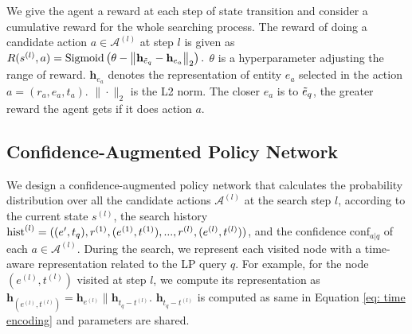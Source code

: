 \documentclass[runningheads]{llncs}
\begin{document}
We give the agent a reward at each step of state transition and consider a cumulative reward for the whole 
searching process. The reward of doing a candidate action $a \in \mathcal{A}^{(l)}$ at step $l$ is given as 
$R(s^{(l)}, a) = \text{Sigmoid}\left(\theta - \left\|\mathbf{h}_{\Tilde{e}_q} - \mathbf{h}_{e_{a}}\right\|_2\right).$
$\theta$ is a hyperparameter adjusting the range of reward. $\mathbf{h}_{e_{a}}$ denotes the representation of entity $e_{a}$ 
selected in the action $a=(r_a, e_a, t_a)$. $\|\cdot\|_2$ is the L2 norm. 
The closer $e_{a}$ is to $\Tilde{e}_q$, the greater reward the agent gets if it does action $a$.
\subsection{Confidence-Augmented Policy Network}
\label{sec: policy}
We design a confidence-augmented policy network that calculates the probability distribution over all the 
candidate actions $\mathcal{A}^{(l)}$ at the search step $l$, according to the current state $s^{(l)}$, 
the search history $\text{hist}^{(l)} = ((e', t_q), r^{(1)}, (e^{(1)}, t^{(1)}), ..., r^{(l)}, \\(e^{(l)}, t^{(l)}))$, 
and the confidence $\text{conf}_{a|q}$ of each $a \in \mathcal{A}^{(l)}$. During the search, we represent each visited node with a time-aware representation related to the LP query $q$. For example, for the node $(e^{(l)}, t^{(l)})$ visited at step $l$, we compute its representation as $\mathbf{h}_{(e^{(l)}, t^{(l)})} = \mathbf{h}_{e^{(l)}} \| \mathbf{h}_{t_q - t^{(l)}}$.
$\mathbf{h}_{t_q - t^{(l)}}$ is computed as same in Equation \ref{eq: time encoding} and parameters are shared.
\end{document}
